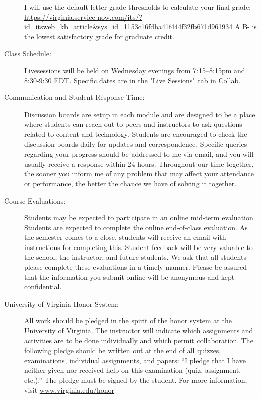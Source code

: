 \documentclass[11pt]{article}
\begin{document}
\begin{description}
I will use the default letter grade thresholds to calculate your final grade: \url{https://virginia.service-now.com/its/?id=itsweb_kb_article&sys_id=1153c16fdba41f444f32fb671d961934} A B- is the lowest satisfactory grade for graduate credit.

\item[Class Schedule:]  

Livesessions will be held on Wednesday evenings from 7:15–8:15pm and 8:30-9:30 EDT. Specific dates are in the "Live Sessions" tab in Collab.

\item[Communication and Student Response Time:]  


Discussion boards are setup in each module and are designed to be a place where students can reach out to peers and instructors to ask questions related to content and technology. Students are encouraged to check the discussion boards daily for updates and correspondence. Specific queries regarding your progress should be addressed to me via email, and you will usually receive a response within 24 hours. Throughout our time together, the sooner you inform me of any problem that may affect your attendance or performance, the better the chance we have of solving it together.


\item[Course Evaluations:]  

Students may be expected to participate in an online mid-term evaluation. Students are expected to complete the online end-of-class evaluation. As the semester comes to a close, students will receive an email with instructions for completing this. Student feedback will be very valuable to the school, the instructor, and future students. We ask that all students please complete these evaluations in a timely manner. Please be assured that the information you submit online will be anonymous and kept confidential.

\item[University of Virginia Honor System:]  

All work should be pledged in the spirit of the honor system at the University of Virginia. The instructor will indicate which assignments and activities are to be done individually and which permit collaboration. The following pledge should be written out at the end of all quizzes, examinations, individual assignments, and papers: “I pledge that I have neither given nor received help on this examination (quiz, assignment, etc.).” The pledge must be signed by the student. For more information, visit \url{www.virginia.edu/honor}


\end{description}
\end{document}
